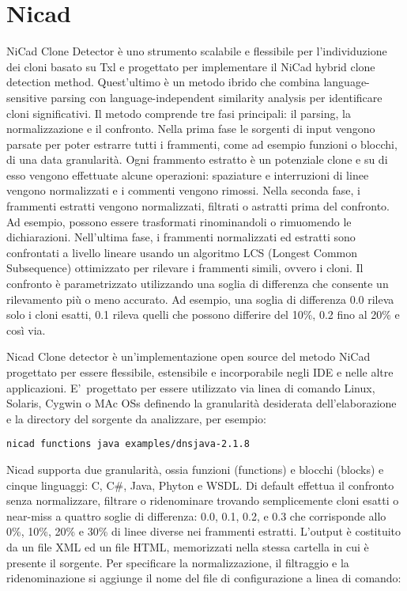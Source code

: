 \section{Nicad}
NiCad Clone Detector è uno strumento scalabile e flessibile per l'individuzione dei cloni basato su Txl e progettato per implementare il NiCad hybrid clone detection method. Quest'ultimo è un metodo ibrido che combina language-sensitive parsing con language-independent similarity analysis per identificare cloni significativi.
Il metodo comprende tre fasi principali: il parsing, la normalizzazione e il confronto.
Nella prima fase le sorgenti di input vengono parsate per poter estrarre tutti i frammenti, come ad esempio funzioni o blocchi, di una data granularità. Ogni frammento estratto è un potenziale clone e su di esso vengono effettuate alcune operazioni: spaziature e interruzioni di linee vengono normalizzati e i commenti vengono rimossi. 
Nella seconda fase, i frammenti estratti vengono normalizzati, filtrati o astratti prima del confronto. Ad esempio, possono essere trasformati rinominandoli o rimuomendo le dichiarazioni.
Nell'ultima fase, i frammenti normalizzati ed estratti sono confrontati a livello lineare usando un algoritmo LCS (Longest Common Subsequence) ottimizzato per rilevare i frammenti simili, ovvero i cloni. Il confronto è parametrizzato utilizzando una soglia di differenza che consente un rilevamento più o meno accurato. Ad esempio, una soglia di differenza 0.0 rileva solo i cloni esatti, 0.1 rileva quelli che possono differire del 10\%, 0.2 fino al 20\% e così via.

Nicad Clone detector è un'implementazione open source del metodo NiCad progettato per essere flessibile, estensibile e incorporabile negli IDE e nelle altre applicazioni. E'\ progettato per essere utilizzato via linea di comando Linux, Solaris, Cygwin o MAc OSs definendo la granularità desiderata dell'elaborazione e la directory del sorgente da analizzare, per esempio: 

\begin{center}
\verb|nicad functions java examples/dnsjava-2.1.8|
\end{center}

Nicad supporta due granularità, ossia funzioni (functions) e blocchi (blocks) e cinque linguaggi: C, C\#, Java, Phyton e WSDL.
Di default effettua il confronto senza normalizzare, filtrare o ridenominare trovando semplicemente cloni esatti o near-miss a quattro soglie di differenza: 0.0, 0.1, 0.2, e 0.3 che corrisponde allo 0\%, 10\%, 20\% e 30\% di linee diverse nei frammenti estratti.
L'output è costituito da un file XML ed un file HTML, memorizzati nella stessa cartella in cui è presente il sorgente. 
Per specificare la normalizzazione, il filtraggio e la ridenominazione si aggiunge il nome del file di configurazione a linea di comando:

